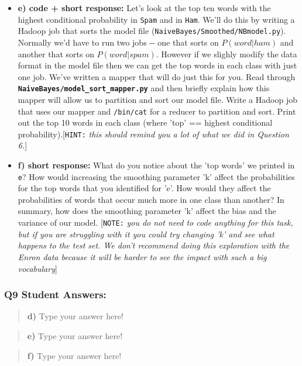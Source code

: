 \documentclass[11pt]{article}
\begin{document}
\begin{itemize}
{  paper}{]}
\item
  \textbf{e) code + short response:} Let's look at the top ten words
  with the highest conditional probability in \texttt{Spam} and in
  \texttt{Ham}. We'll do this by writing a Hadoop job that sorts the
  model file (\texttt{NaiveBayes/Smoothed/NBmodel.py}). Normally we'd
  have to run two jobs -\/- one that sorts on \(P(word|ham)\) and
  another that sorts on \(P(word|spam)\). However if we slighly modify
  the data format in the model file then we can get the top words in
  each class with just one job. We've written a mapper that will do just
  this for you. Read through
  \textbf{\texttt{NaiveBayes/model\_sort\_mapper.py}} and then briefly
  explain how this mapper will allow us to partition and sort our model
  file. Write a Hadoop job that uses our mapper and \texttt{/bin/cat}
  for a reducer to partition and sort. Print out the top 10 words in
  each class (where 'top' == highest conditional
  probability).{[}\texttt{HINT:} \emph{this should remind you a lot of
  what we did in Question 6.}{]}
\item
  \textbf{f) short response:} What do you notice about the 'top words'
  we printed in \texttt{e}? How would increasing the smoothing parameter
  'k' affect the probabilities for the top words that you identified for
  'e'. How would they affect the probabilities of words that occur much
  more in one class than another? In summary, how does the smoothing
  parameter 'k' affect the bias and the variance of our model.
  {[}\texttt{NOTE:} \emph{you do not need to code anything for this
  task, but if you are struggling with it you could try changing 'k' and
  see what happens to the test set. We don't recommend doing this
  exploration with the Enron data because it will be harder to see the
  impact with such a big vocabulary}{]}
\end{itemize}

    \subsubsection{Q9 Student Answers:}\label{q9-student-answers}

\begin{quote}
\textbf{d)} Type your answer here!
\end{quote}

\begin{quote}
\textbf{e)} Type your answer here!
\end{quote}

\begin{quote}
\textbf{f)} Type your answer here!
\end{quote}
\end{document}
